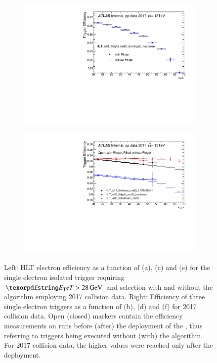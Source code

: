 \begin{figure}[h!tb]
\begin{subfigure}[c]{.49\textwidth}
  \includegraphics[width=\textwidth]{sections/03_operation/figures/efficiencies/eff_EGAM1_e28_ringer_and_noringer_2017_after_ts1_HLT_mu.pdf}
  \caption{}%
  \label{fig:e28_comp_mu}
  \end{subfigure}
  \begin{subfigure}[c]{.49\textwidth}
  \centering
  \includegraphics[width=\textwidth]{sections/03_operation/figures/efficiencies/eff_EGAM1_e17_e26_e60_2017_before_and_after_ts1_mu.pdf}
  \caption{}%
  \end{subfigure}
  
  \caption{Left: HLT electron efficiency as a function of \et{} (a), \eta{} (c) and \avgmu{} (e) for the single electron isolated trigger requiring $\et{} > \SI{28}{\GeV}$ and \tight{} selection with and without the \rnn{} algorithm employing 2017 collision data. Right: Efficiency of three single electron triggers as a function of \et (b), \eta (d) and \avgmu (f) for 2017 collision data. Open (closed) markers contain the efficiency measurements on runs before (after) the deployment of the \rnn{}, thus referring to triggers being executed without (with) the \rnn{} algorithm. For 2017 collision data, the higher \avgmu{} values were reached only after the deployment.}
  \label{fig:2017_zee_triggers}
\end{figure}




